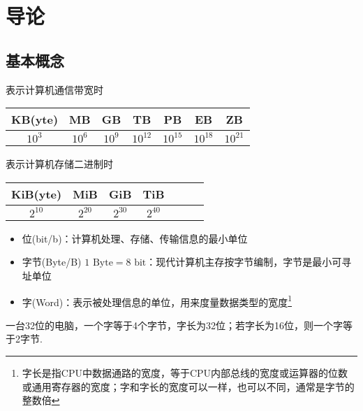 
\section{导论}
\subsection{基本概念}
表示计算机通信带宽时
\begin{center}
\begin{tabular}{ccccccc}\hline
KB(yte) & MB & GB & TB & PB & EB & ZB\\\hline
$10^3$ & $10^6$ & $10^9$ & $10^{12}$ & $10^{15}$ & $10^{18}$ & $10^{21}$\\\hline
\end{tabular}
\end{center}
表示计算机存储二进制时
\begin{center}
\begin{tabular}{ccccccc}\hline
KiB(yte) & MiB & GiB & TiB\\\hline
$2^{10}$ & $2^{20}$ & $2^{30}$ & $2^{40}$\\\hline
\end{tabular}
\end{center}
\begin{itemize}
	\item 位(bit/b)：计算机处理、存储、传输信息的最小单位
	\item 字节(Byte/B) $1\text{ Byte}=8\text{ bit}$：现代计算机主存按字节编制，字节是最小可寻址单位
	\item 字(Word)：表示被处理信息的单位，用来度量数据类型的宽度\footnote{字长是指CPU中数据通路的宽度，等于CPU内部总线的宽度或运算器的位数或通用寄存器的宽度；字和字长的宽度可以一样，也可以不同，通常是字节的整数倍}
\end{itemize}
\par 一台32位的电脑，一个字等于4个字节，字长为32位；若字长为16位，则一个字等于2字节.

